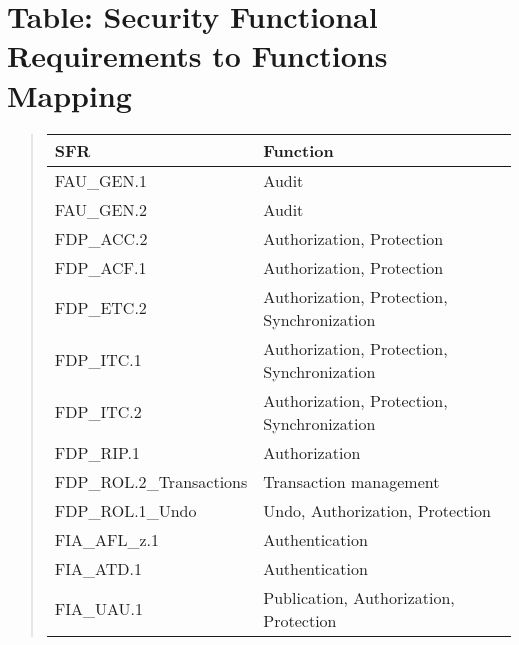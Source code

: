 \documentclass[10pt,a4paper,english]{book}
\newlength{\locallinewidth}
\begin{document}

\hypertarget{table-security-functional-requirements-to-functions-mapping}{}
\section{Table: Security Functional Requirements to Functions Mapping}
\begin{quote}

\begin{longtable}[c]{|p{0.27\locallinewidth}|p{0.59\locallinewidth}|}
\hline
\textbf{
SFR
} & \textbf{
Function
} \\
\hline
\endhead

FAU{\_}GEN.1
 & 
Audit
 \\
\hline

FAU{\_}GEN.2
 & 
Audit
 \\
\hline

FDP{\_}ACC.2
 & 
Authorization, Protection
 \\
\hline

FDP{\_}ACF.1
 & 
Authorization, Protection
 \\
\hline

FDP{\_}ETC.2
 & 
Authorization, Protection, Synchronization
 \\
\hline

FDP{\_}ITC.1
 & 
Authorization, Protection, Synchronization
 \\
\hline

FDP{\_}ITC.2
 & 
Authorization, Protection, Synchronization
 \\
\hline

FDP{\_}RIP.1
 & 
Authorization
 \\
\hline

FDP{\_}ROL.2{\_}Transactions
 & 
Transaction management
 \\
\hline

FDP{\_}ROL.1{\_}Undo
 & 
Undo, Authorization, Protection
 \\
\hline

FIA{\_}AFL{\_}z.1
 & 
Authentication
 \\
\hline

FIA{\_}ATD.1
 & 
Authentication
 \\
\hline

FIA{\_}UAU.1
 & 
Publication, Authorization, Protection
 \\
\hline


\end{longtable}
\end{quote}
\end{document}
